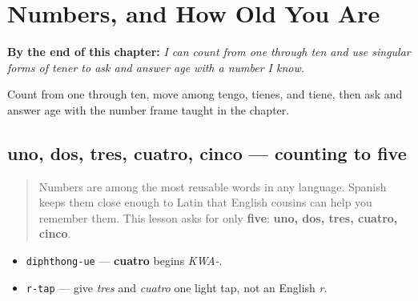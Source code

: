 
\chapter{Numbers, and How Old You Are}
\label{ch:numbers-and-age}

\begin{chapteropening}
\textbf{By the end of this chapter:} \emph{I can count from one through ten and use singular forms of tener to ask and answer age with a number I know.}

Count from one through ten, move among tengo, tienes, and tiene, then ask and answer age with the number frame taught in the chapter.
\end{chapteropening}

\section[uno, dos, tres, cuatro, cinco]{uno, dos, tres, cuatro, cinco — counting to five}

\label{lesson:ES-C08-numeros-1-5}



\begin{quote}
Numbers are among the most reusable words in any language. Spanish keeps them close enough to Latin that English cousins can help you remember them. This lesson asks for only \textbf{five}: \textbf{uno, dos, tres, cuatro, cinco}.
\end{quote}

\begin{sounds}
\begin{itemize}
\raggedright
  \item \texttt{diphthong-ue} — \textbf{cuatro} begins \emph{KWA-}.
  \item \texttt{r-tap} — give \emph{tres} and \emph{cuatro} one light tap, not an English \emph{r}.
\end{itemize}
\end{sounds}

